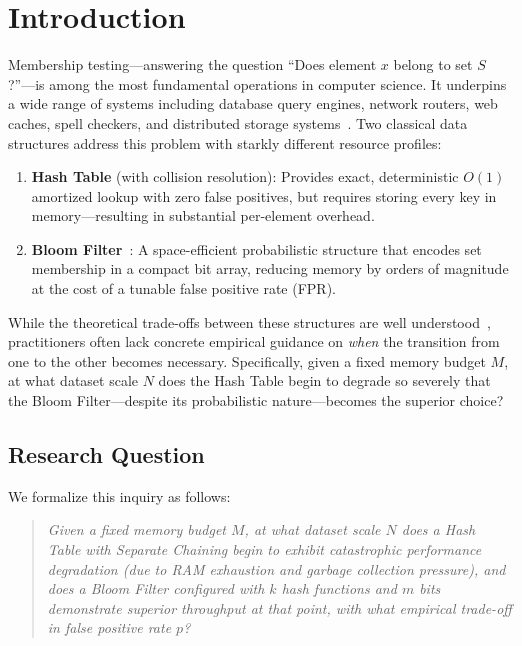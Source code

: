 \section{Introduction}
\label{sec:introduction}

Membership testing---answering the question ``Does element $x$ belong to set $S$?''---is among the most fundamental operations in computer science. It underpins a wide range of systems including database query engines, network routers, web caches, spell checkers, and distributed storage systems~\citep{broder2004, chang2008}. Two classical data structures address this problem with starkly different resource profiles:

\begin{enumerate}[leftmargin=*, label=(\roman*)]
    \item \textbf{Hash Table} (with collision resolution): Provides exact, deterministic $O(1)$ amortized lookup with zero false positives, but requires storing every key in memory---resulting in substantial per-element overhead.
    \item \textbf{Bloom Filter}~\citep{bloom1970}: A space-efficient probabilistic structure that encodes set membership in a compact bit array, reducing memory by orders of magnitude at the cost of a tunable false positive rate (FPR).
\end{enumerate}

While the theoretical trade-offs between these structures are well understood~\citep{mitzenmacher2017, cormen2022}, practitioners often lack concrete empirical guidance on \emph{when} the transition from one to the other becomes necessary. Specifically, given a fixed memory budget $M$, at what dataset scale $N$ does the Hash Table begin to degrade so severely that the Bloom Filter---despite its probabilistic nature---becomes the superior choice?

\subsection{Research Question}
\label{subsec:rq}

We formalize this inquiry as follows:

\begin{quote}
\textit{Given a fixed memory budget $M$, at what dataset scale $N$ does a Hash Table with Separate Chaining begin to exhibit catastrophic performance degradation (due to RAM exhaustion and garbage collection pressure), and does a Bloom Filter configured with $k$ hash functions and $m$ bits demonstrate superior throughput at that point, with what empirical trade-off in false positive rate $p$?}
\end{quote}

